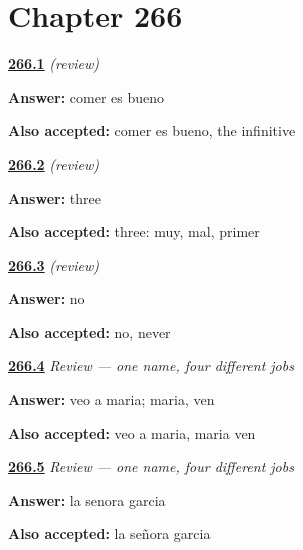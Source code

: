 \section*{Chapter 266}

\noindent\begin{minipage}[t]{\linewidth}
\raggedright
\hyperlink{review-ES-C67-repaso-a1-inf}{\textbf{266.1}} \emph{(review)}\par
\small \textbf{Answer:} comer es bueno\par
\footnotesize \textbf{Also accepted:} comer es bueno, the infinitive
\end{minipage}\par\medskip

\noindent\begin{minipage}[t]{\linewidth}
\raggedright
\hyperlink{review-ES-C67-repaso-a1-apocope}{\textbf{266.2}} \emph{(review)}\par
\small \textbf{Answer:} three\par
\footnotesize \textbf{Also accepted:} three: muy, mal, primer
\end{minipage}\par\medskip

\noindent\begin{minipage}[t]{\linewidth}
\raggedright
\hyperlink{review-ES-C67-repaso-a1-otro}{\textbf{266.3}} \emph{(review)}\par
\small \textbf{Answer:} no\par
\footnotesize \textbf{Also accepted:} no, never
\end{minipage}\par\medskip

\noindent\begin{minipage}[t]{\linewidth}
\raggedright
\hyperlink{review-ES-C67-repaso-lo-que-reemplazo-los-casos-dos}{\textbf{266.4}} \emph{Review — one name, four different jobs}\par
\small \textbf{Answer:} veo a maria; maria, ven\par
\footnotesize \textbf{Also accepted:} veo a maria, maria ven
\end{minipage}\par\medskip

\noindent\begin{minipage}[t]{\linewidth}
\raggedright
\hyperlink{review-ES-C67-repaso-lo-que-reemplazo-los-casos-titulo}{\textbf{266.5}} \emph{Review — one name, four different jobs}\par
\small \textbf{Answer:} la senora garcia\par
\footnotesize \textbf{Also accepted:} la señora garcia
\end{minipage}\par\medskip

